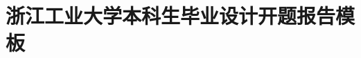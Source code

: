 \documentclass[12pt,openany,oneside]{book}
\begin{document}
\graphicspath{{figures/}}  %

\mainmatter{}\sloppy\raggedbottom

\begingroup %
\let\clearpage\relax %
\titleformat{\chapter}{\centering\hei\sanhao\bfseries}{\chaptername}{1em}{} %
\chapter*{浙江工业大学本科生毕业设计开题报告模板}
\titleformat{\chapter}{\hei\sihao\bfseries}{\chaptername}{1em}{} %






\endgroup %
\clearpage %

{}
\nocite{*}                                     %

\end{document}
